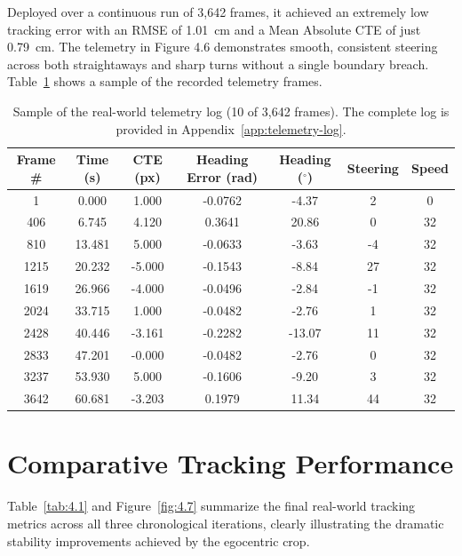 Deployed over a continuous run of 3,642 frames, it achieved an extremely low tracking error with an RMSE of 1.01~cm and a Mean Absolute CTE of just 0.79~cm. The telemetry in Figure 4.6 demonstrates smooth, consistent steering across both straightaways and sharp turns without a single boundary breach. Table~\ref{tab:telemetry-log-sample} shows a sample of the recorded telemetry frames.

\begin{table}[H]
	\centering
	\caption{Sample of the real-world telemetry log (10 of 3,642 frames). The complete log is provided in Appendix~\ref{app:telemetry-log}.}
	\label{tab:telemetry-log-sample}
	\begin{tabular}{c c c c c c c}
		\toprule
		Frame \# & Time (s) & CTE (px) & Heading Error (rad) & Heading ($^{\circ}$) & Steering & Speed \\
		\midrule
		1    & 0.000  & 1.000  & -0.0762 & -4.37  & 2   & 0  \\
		406  & 6.745  & 4.120  & 0.3641  & 20.86  & 0   & 32 \\
		810  & 13.481 & 5.000  & -0.0633 & -3.63  & -4  & 32 \\
		1215 & 20.232 & -5.000 & -0.1543 & -8.84  & 27  & 32 \\
		1619 & 26.966 & -4.000 & -0.0496 & -2.84  & -1  & 32 \\
		2024 & 33.715 & 1.000  & -0.0482 & -2.76  & 1   & 32 \\
		2428 & 40.446 & -3.161 & -0.2282 & -13.07 & 11  & 32 \\
		2833 & 47.201 & -0.000 & -0.0482 & -2.76  & 0   & 32 \\
		3237 & 53.930 & 5.000  & -0.1606 & -9.20  & 3   & 32 \\
		3642 & 60.681 & -3.203 & 0.1979  & 11.34  & 44  & 32 \\
		\bottomrule
	\end{tabular}
\end{table}

\FloatBarrier

\section{Comparative Tracking Performance}
Table~\ref{tab:4.1} and Figure~\ref{fig:4.7} summarize the final real-world tracking metrics across all three chronological iterations, clearly illustrating the dramatic stability improvements achieved by the egocentric crop.

